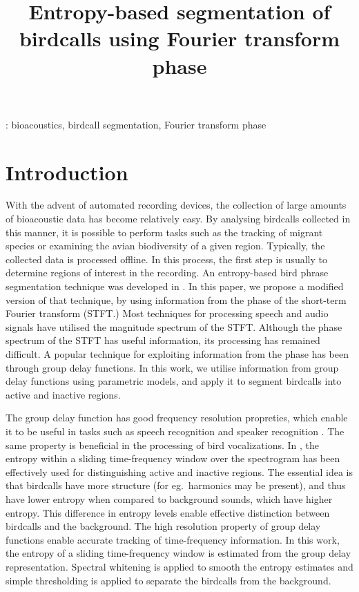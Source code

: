 \documentclass[a4paper]{article}
\title{Entropy-based segmentation of birdcalls using Fourier transform phase}
\begin{document}
  \maketitle
  \begin{abstract}
  \end{abstract}
  : bioacoustics, birdcall segmentation, Fourier transform phase
  



\section{Introduction}

With the advent of automated recording devices, the collection of large amounts of
bioacoustic data has become relatively easy. By analysing birdcalls collected in
this manner, it is possible to perform tasks such as the tracking of migrant
species or examining the avian biodiversity of a given region. Typically, the
collected data is processed offline. In this process, the first step is usually to
determine regions of interest in the recording. An entropy-based bird phrase segmentation
technique was developed in \cite{wang2013}. In this paper, we propose a modified
version of that technique, by using information from the phase of the short-term
Fourier transform (STFT.) Most techniques for processing speech and audio signals have
utilised the magnitude spectrum of the STFT. Although the phase spectrum of the STFT has 
useful information, its processing has remained difficult. A popular technique
for exploiting information from the phase has been through group delay functions. In
this work, we utilise information from group delay functions using parametric
models, and apply it to segment birdcalls into active and inactive regions.

The group delay function has good frequency resolution propreties, which enable
it to be useful in tasks such as speech recognition and speaker recognition
\cite{hema,padman}. The same property is beneficial in the processing of bird
vocalizations. In \cite{wang2013}, the entropy within a sliding time-frequency
window over the spectrogram has been effectively used for distinguishing active
and inactive regions. The essential idea is that birdcalls have more structure
(for eg.~harmonics may be present), and thus have lower entropy when compared to
 background sounds, which have higher entropy. This difference in entropy
levels enable effective distinction between birdcalls and the background.
The high resolution property of group delay functions enable accurate tracking
of time-frequency information. In this work, the entropy of a sliding
time-frequency window is estimated from the group delay representation. Spectral
whitening is applied to smooth the entropy estimates and simple thresholding is
applied to separate the birdcalls from the background.
\end{document}
